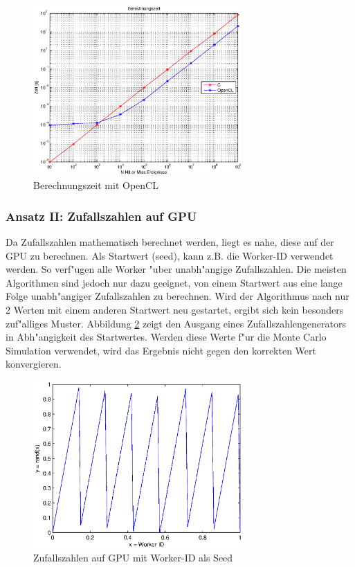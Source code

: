 \begin{refsection}
\begin{figure}[ht!]
	\centering
	\includegraphics[width=8cm]{montecarlo/images/Berechnungszeit_OpenCL.eps}
	\caption{Berechnungszeit mit OpenCL}
	\label{fig:OpenCL_Berechnungszeit}
\end{figure}


\subsubsection{Ansatz II: Zufallszahlen auf GPU}
Da Zufallszahlen mathematisch berechnet werden, liegt es nahe,
diese auf der GPU zu berechnen. Als Startwert (seed), kann z.B. die
Worker-ID verwendet werden. So verf"ugen alle Worker "uber unabh"angige
Zufallszahlen. Die meisten Algorithmen sind jedoch nur dazu geeignet,
von einem Startwert aus eine lange Folge unabh"angiger Zufallszahlen zu
berechnen. Wird der Algorithmus nach nur 2 Werten mit einem anderen
Startwert neu gestartet, ergibt sich kein besonders zuf"alliges
Muster. Abbildung \ref{fig:OpenCL_ID_Seed} zeigt den Ausgang eines
Zufallszahlengenerators in Abh"angigkeit des Startwertes. Werden diese
Werte f"ur die Monte Carlo Simulation verwendet, wird das Ergebnis nicht
gegen den korrekten Wert konvergieren.

\begin{figure}[ht!]
	\centering
	\includegraphics[width=8cm]{montecarlo/images/idAsSeed.eps}
	\caption{Zufallszahlen auf GPU mit Worker-ID als Seed}
	\label{fig:OpenCL_ID_Seed}
\end{figure}


\end{refsection}
